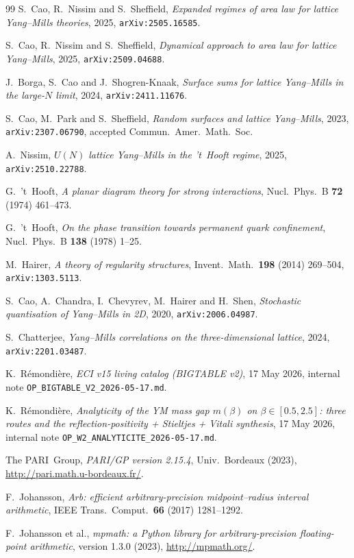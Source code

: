 \documentclass[11pt,a4paper]{article}
\theoremstyle{definition}
\theoremstyle{remark}
\begin{document}
\begin{thebibliography}{99}
S.~Cao, R.~Nissim and S.~Sheffield,
\emph{Expanded regimes of area law for lattice Yang--Mills theories},
2025, \texttt{arXiv:2505.16585}.

S.~Cao, R.~Nissim and S.~Sheffield,
\emph{Dynamical approach to area law for lattice Yang--Mills},
2025, \texttt{arXiv:2509.04688}.

J.~Borga, S.~Cao and J.~Shogren-Knaak,
\emph{Surface sums for lattice Yang--Mills in the large-$N$ limit},
2024, \texttt{arXiv:2411.11676}.

S.~Cao, M.~Park and S.~Sheffield,
\emph{Random surfaces and lattice Yang--Mills},
2023, \texttt{arXiv:2307.06790}, accepted Commun.\ Amer.\ Math.\ Soc.

A.~Nissim,
\emph{$U(N)$ lattice Yang--Mills in the 't~Hooft regime},
2025, \texttt{arXiv:2510.22788}.

G.~'t~Hooft,
\emph{A planar diagram theory for strong interactions},
Nucl.\ Phys.\ B \textbf{72} (1974) 461--473.

G.~'t~Hooft,
\emph{On the phase transition towards permanent quark confinement},
Nucl.\ Phys.\ B \textbf{138} (1978) 1--25.

M.~Hairer,
\emph{A theory of regularity structures},
Invent.\ Math.\ \textbf{198} (2014) 269--504,
\texttt{arXiv:1303.5113}.

S.~Cao, A.~Chandra, I.~Chevyrev, M.~Hairer and H.~Shen,
\emph{Stochastic quantisation of Yang--Mills in 2D},
2020, \texttt{arXiv:2006.04987}.

S.~Chatterjee,
\emph{Yang--Mills correlations on the three-dimensional lattice},
2024, \texttt{arXiv:2201.03487}.

K.~R\'emondi\`ere,
\emph{ECI v15 living catalog (BIGTABLE v2)},
17 May 2026, internal note
\texttt{OP\_BIGTABLE\_V2\_2026-05-17.md}.

K.~R\'emondi\`ere,
\emph{Analyticity of the YM mass gap $m(\beta)$ on $\beta \in [0.5, 2.5]$:
three routes and the reflection-positivity + Stieltjes + Vitali
synthesis},
17 May 2026, internal note
\texttt{OP\_W2\_ANALYTICITE\_2026-05-17.md}.

The PARI~Group,
\emph{PARI/GP version 2.15.4},
Univ.\ Bordeaux (2023), \url{http://pari.math.u-bordeaux.fr/}.

F.~Johansson,
\emph{Arb: efficient arbitrary-precision midpoint--radius interval
arithmetic},
IEEE Trans.\ Comput.\ \textbf{66} (2017) 1281--1292.

F.~Johansson et al.,
\emph{mpmath: a Python library for arbitrary-precision floating-point
arithmetic}, version 1.3.0 (2023), \url{http://mpmath.org/}.

\end{thebibliography}
\end{document}
